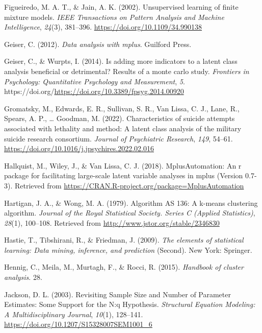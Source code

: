 \documentclass[
  ,man,floatsintext]{apa6}
\newlength{\cslhangindent}
\newlength{\cslentryspacingunit} %
\newenvironment{CSLReferences}[2] %
 {%
  \setlength{\parindent}{0pt}
  \ifodd #1
  \let\oldpar\par
  \def\par{\hangindent=\cslhangindent\oldpar}
  \fi
  \setlength{\parskip}{#2\cslentryspacingunit}
 }%
 {}
\begin{document}
\begin{CSLReferences}{1}{0}
\leavevmode{}%
Figueiredo, M. A. T., \& Jain, A. K. (2002). Unsupervised learning of finite mixture models. \emph{{IEEE} Transactions on Pattern Analysis and Machine Intelligence}, \emph{24}(3), 381--396. \url{https://doi.org/10.1109/34.990138}

\leavevmode{}%
Geiser, C. (2012). \emph{Data analysis with mplus}. Guilford Press.

\leavevmode{}%
Geiser, C., \& Wurpts, I. (2014). Is adding more indicators to a latent class analysis beneficial or detrimental? Results of a monte carlo study. \emph{Frontiers in Psychology: Quantitative Psychology and Measurement}, \emph{5}. https://doi.org/\url{https://doi.org/10.3389/fpsyg.2014.00920}

\leavevmode{}%
Gromatsky, M., Edwards, E. R., Sullivan, S. R., Van Lissa, C. J., Lane, R., Spears, A. P., \ldots{} Goodman, M. (2022). Characteristics of suicide attempts associated with lethality and method: A latent class analysis of the military suicide research consortium. \emph{Journal of Psychiatric Research}, \emph{149}, 54--61. \url{https://doi.org/10.1016/j.jpsychires.2022.02.016}

\leavevmode{}%
Hallquist, M., Wiley, J., \& Van Lissa, C. J. (2018). {MplusAutomation}: An r package for facilitating large-scale latent variable analyses in mplus (Version 0.7-3). Retrieved from \url{https://CRAN.R-project.org/package=MplusAutomation}

\leavevmode{}%
Hartigan, J. A., \& Wong, M. A. (1979). Algorithm AS 136: A k-means clustering algorithm. \emph{Journal of the Royal Statistical Society. Series C (Applied Statistics)}, \emph{28}(1), 100--108. Retrieved from \url{http://www.jstor.org/stable/2346830}

\leavevmode{}%
Hastie, T., Tibshirani, R., \& Friedman, J. (2009). \emph{The elements of statistical learning: Data mining, inference, and prediction} (Second). New York: Springer.

\leavevmode{}%
Hennig, C., Meila, M., Murtagh, F., \& Rocci, R. (2015). \emph{Handbook of cluster analysis}. 28.

\leavevmode{}%
Jackson, D. L. (2003). Revisiting {Sample Size} and {Number} of {Parameter Estimates}: {Some Support} for the {N}:q {Hypothesis}. \emph{Structural Equation Modeling: A Multidisciplinary Journal}, \emph{10}(1), 128--141. \url{https://doi.org/10.1207/S15328007SEM1001_6}


\end{CSLReferences}
\end{document}
